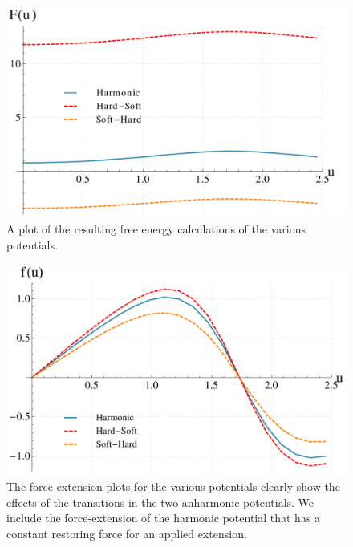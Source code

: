 \begin{figure}[H]
\centering \includegraphics[scale=0.4]{Results/Collagen/various_potentials/col_fe_N5_L6_m24_kappa1_sigma1.pdf}
\caption{A plot of the resulting free energy calculations of the various potentials.}
\label{fig:collagen_fe}
\end{figure}

\begin{figure}[H]
\centering \includegraphics[scale=0.4]{Results/Collagen/various_potentials/col_dfe_N5_L6_m24_kappa1_sigma1.pdf}
\caption{The force-extension plots for the various potentials clearly show the effects of the transitions in the two anharmonic potentials. We include the force-extension of the harmonic potential that has a constant restoring force for an applied extension.}
\label{fig:collagen_dfe}
\end{figure}

